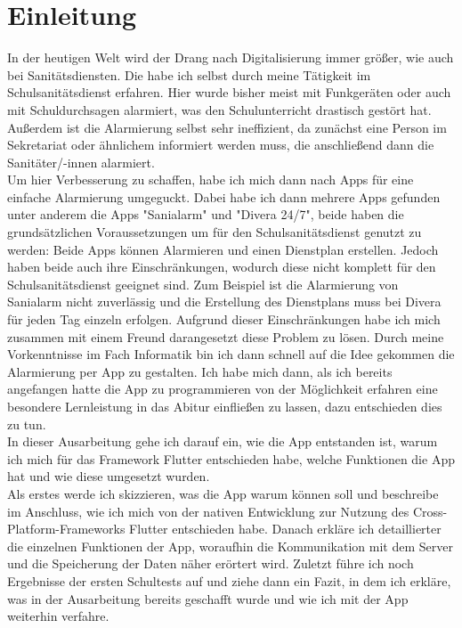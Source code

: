 \documentclass[12pt]{article}
\begin{document}
\newpage
\section{Einleitung}
\setcounter{page}{4}
    In der heutigen Welt wird der Drang nach Digitalisierung immer größer, wie auch bei Sanitätsdiensten.
    Die habe ich selbst durch meine Tätigkeit im Schulsanitätsdienst erfahren. Hier wurde bisher meist mit
    Funkgeräten oder auch mit Schuldurchsagen alarmiert, was den Schulunterricht drastisch gestört hat.
    Außerdem ist die Alarmierung selbst sehr ineffizient, da zunächst eine Person im Sekretariat oder ähnlichem 
    informiert werden muss, die anschließend dann die Sanitäter/-innen alarmiert.\\ 
    Um hier Verbesserung zu schaffen, habe ich mich dann nach Apps für eine einfache Alarmierung umgeguckt. Dabei habe ich dann
    mehrere Apps gefunden unter anderem die Apps "Sanialarm" und "Divera 24/7", beide haben die grundsätzlichen Voraussetzungen um 
    für den Schulsanitätsdienst genutzt zu werden: Beide Apps können Alarmieren und einen Dienstplan erstellen.
    Jedoch haben beide auch ihre Einschränkungen, wodurch diese nicht komplett für den Schulsanitätsdienst geeignet sind. 
    Zum Beispiel ist die Alarmierung von Sanialarm nicht zuverlässig und die Erstellung des Dienstplans muss bei Divera für jeden Tag einzeln erfolgen.
    Aufgrund dieser Einschränkungen habe ich mich zusammen mit einem Freund darangesetzt diese Problem zu lösen.
    Durch meine Vorkenntnisse im Fach Informatik bin ich dann schnell auf die Idee gekommen
    die Alarmierung per App zu gestalten. 
    Ich habe mich dann, als ich bereits angefangen hatte die App zu programmieren von der Möglichkeit erfahren
    eine besondere Lernleistung in das Abitur einfließen zu lassen, dazu entschieden dies zu tun.\\
    In dieser Ausarbeitung gehe ich darauf ein, wie die App entstanden ist, warum ich mich für das Framework Flutter
    entschieden habe, welche Funktionen die App hat und wie diese umgesetzt wurden.\\
    Als erstes werde ich skizzieren, was die App warum können soll und beschreibe im Anschluss, wie
    ich mich von der nativen Entwicklung zur Nutzung des Cross-Platform-Frameworks Flutter entschieden habe.
    Danach erkläre ich detaillierter die einzelnen Funktionen der App, woraufhin die Kommunikation mit dem 
    Server und die Speicherung der Daten näher erörtert wird. Zuletzt führe ich noch Ergebnisse der ersten 
    Schultests auf und ziehe dann ein Fazit, in dem ich erkläre, was in der Ausarbeitung bereits geschafft 
    wurde und wie ich mit der App weiterhin verfahre.
\end{document}
